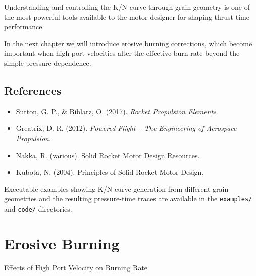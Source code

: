 \documentclass[
  letterpaper,
  DIV=11,
  numbers=noendperiod]{scrreprt}
\providecommand{\tightlist}{%
  \setlength{\itemsep}{0pt}\setlength{\parskip}{0pt}}
\begin{document}
Understanding and controlling the K/N curve through grain geometry is
one of the most powerful tools available to the motor designer for
shaping thrust-time performance.

In the next chapter we will introduce erosive burning corrections, which
become important when high port velocities alter the effective burn rate
beyond the simple pressure dependence.

\section{References}\label{references}

\begin{itemize}
\tightlist
\item
  Sutton, G. P., \& Biblarz, O. (2017). \emph{Rocket Propulsion
  Elements}.
\item
  Greatrix, D. R. (2012). \emph{Powered Flight -- The Engineering of
  Aerospace Propulsion}.
\item
  Nakka, R. (various). Solid Rocket Motor Design Resources.
\item
  Kubota, N. (2004). Principles of Solid Rocket Motor Design.
\end{itemize}

\begin{tcolorbox}[enhanced jigsaw, arc=.35mm, bottomrule=.15mm, bottomtitle=1mm, breakable, colback=white, colbacktitle=quarto-callout-note-color!10!white, colframe=quarto-callout-note-color-frame, coltitle=black, left=2mm, leftrule=.75mm, opacityback=0, opacitybacktitle=0.6, rightrule=.15mm, title=\textcolor{quarto-callout-note-color}{\faInfo}\hspace{0.5em}{Note}, titlerule=0mm, toprule=.15mm, toptitle=1mm]

Executable examples showing K/N curve generation from different grain
geometries and the resulting pressure-time traces are available in the
\texttt{examples/} and \texttt{code/} directories.

\end{tcolorbox}


\chapter{Erosive Burning}\label{erosive-burning}

Effects of High Port Velocity on Burning Rate

\hfill\break
\end{document}
